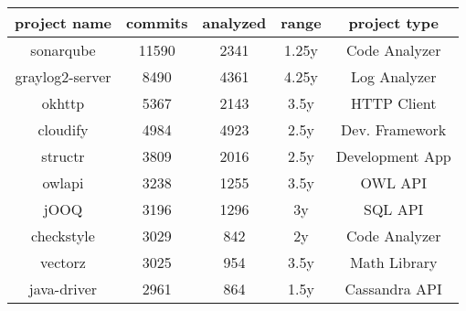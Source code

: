 \begin{table}
	\begin{tabular}{ | c | c | c | c | c | }
		\hline
		project name & commits & analyzed & range & project type \\
		\hline
		sonarqube & 11590 & 2341 & 1.25y & Code Analyzer \\
		graylog2-server & 8490 & 4361 & 4.25y & Log Analyzer \\
		okhttp & 5367 & 2143 & 3.5y & HTTP Client \\
		cloudify & 4984 & 4923 & 2.5y & Dev. Framework \\
		structr & 3809 & 2016 & 2.5y & Development App \\
		owlapi & 3238 & 1255 & 3.5y & OWL API \\
		jOOQ & 3196 & 1296 & 3y & SQL API \\
		checkstyle & 3029 & 842 & 2y & Code Analyzer \\
		vectorz & 3025 & 954 & 3.5y & Math Library \\
		java-driver & 2961 & 864 & 1.5y & Cassandra API \\
		\hline
	\end{tabular}
\end{table}
